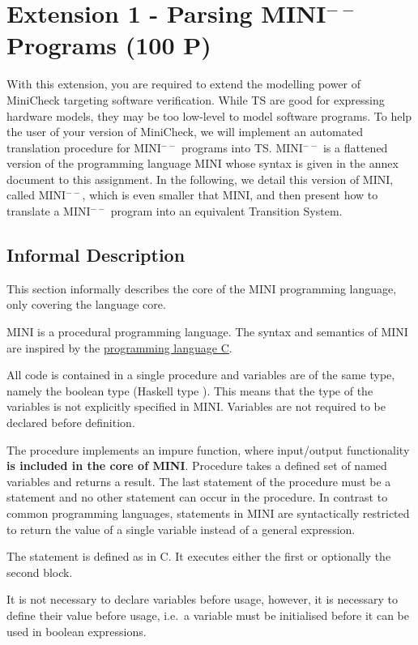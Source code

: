\documentclass{article}
\begin{document}
\section{Extension 1 - Parsing MINI$^{--}$ Programs (100 P)}
\label{sec:ext1}
With this extension, you are required to extend the modelling power of MiniCheck targeting 
software verification. While TS are good for expressing hardware models, they may be too low-level 
to model software programs. To help the user of your version of MiniCheck, we will implement an 
automated translation procedure for MINI$^{--}$ programs into TS. MINI$^{--}$ is a flattened version of the programming language MINI whose syntax
is given in the annex document to this assignment. In the following, we detail this version of MINI, called MINI$^{--}$, which is even smaller that MINI, and then present how to translate a MINI$^{--}$ program into an equivalent Transition System.

\subsection{Informal Description}
This section informally describes the core of the MINI programming language, only covering the language core.

MINI is a procedural programming language. The syntax and semantics of MINI are inspired by the \href{https://en.wikipedia.org/wiki/C_(programming_language)}{programming language C}.

All code is contained in a single procedure  and variables are of the same type, namely the boolean type (Haskell type ). This means that the type of the variables is not explicitly specified in MINI. Variables are not required to be declared before definition.

The procedure  implements an impure function, where input/output functionality \textbf{is  included in the core of MINI}. Procedure  takes a defined set of named variables and returns a result. The last statement of the procedure must be a  statement and no other  statement can occur in the procedure. In contrast to common programming languages,  statements in MINI are syntactically restricted to return the value of a single variable instead of a general expression.

The  statement is defined as in C. It executes either the first or optionally the second block.

It is not necessary to declare variables before usage, however, it is necessary to define their value before usage, i.e.~a variable must be initialised before it can be used in boolean expressions.
\end{document}
